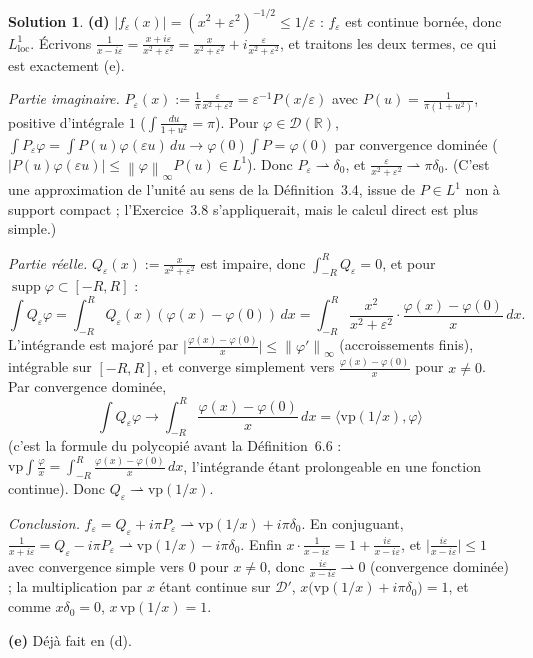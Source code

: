 \documentclass[11pt,a4paper]{article}
\newcommand{\R}{\mathbb{R}}
\newcommand{\norm}[1]{\left\|#1\right\|}
\newcommand{\wk}{\rightharpoonup}
\DeclareMathOperator{\supp}{supp}
\newcommand{\D}{\mathcal{D}}
\theoremstyle{definition}
\newtheorem*{solution}{Solution}
\begin{document}
\begin{solution}
\medskip
\noindent\textbf{(d)} $|f_\varepsilon(x)|=(x^2+\varepsilon^2)^{-1/2}\le1/\varepsilon$ : $f_\varepsilon$ est continue bornée, donc $L^1_{\mathrm{loc}}$. Écrivons $\frac1{x-i\varepsilon}=\frac{x+i\varepsilon}{x^2+\varepsilon^2}=\frac x{x^2+\varepsilon^2}+i\frac\varepsilon{x^2+\varepsilon^2}$, et traitons les deux termes, ce qui est exactement (e).

\emph{Partie imaginaire.} $P_\varepsilon(x):=\frac1\pi\frac\varepsilon{x^2+\varepsilon^2}=\varepsilon^{-1}P(x/\varepsilon)$ avec $P(u)=\frac1{\pi(1+u^2)}$, positive d'intégrale $1$ ($\int\frac{du}{1+u^2}=\pi$). Pour $\varphi\in\D(\R)$, $\int P_\varepsilon\varphi=\int P(u)\varphi(\varepsilon u)\,du\to\varphi(0)\int P=\varphi(0)$ par convergence dominée ($|P(u)\varphi(\varepsilon u)|\le\norm\varphi_\infty P(u)\in L^1$). Donc $P_\varepsilon\wk\delta_0$, et $\frac\varepsilon{x^2+\varepsilon^2}\wk\pi\delta_0$. (C'est une approximation de l'unité au sens de la Définition~3.4, issue de $P\in L^1$ non à support compact ; l'Exercice~3.8 s'appliquerait, mais le calcul direct est plus simple.)

\emph{Partie réelle.} $Q_\varepsilon(x):=\frac x{x^2+\varepsilon^2}$ est impaire, donc $\int_{-R}^RQ_\varepsilon=0$, et pour $\supp\varphi\subset[-R,R]$ :
\[
\int Q_\varepsilon\varphi=\int_{-R}^RQ_\varepsilon(x)(\varphi(x)-\varphi(0))\,dx=\int_{-R}^R\frac{x^2}{x^2+\varepsilon^2}\cdot\frac{\varphi(x)-\varphi(0)}x\,dx .
\]
L'intégrande est majoré par $\big|\frac{\varphi(x)-\varphi(0)}x\big|\le\norm{\varphi'}_\infty$ (accroissements finis), intégrable sur $[-R,R]$, et converge simplement vers $\frac{\varphi(x)-\varphi(0)}x$ pour $x\ne0$. Par convergence dominée,
\[
\int Q_\varepsilon\varphi\longrightarrow\int_{-R}^R\frac{\varphi(x)-\varphi(0)}x\,dx=\langle\mathrm{vp}(1/x),\varphi\rangle
\]
(c'est la formule du polycopié avant la Définition~6.6 : $\mathrm{vp}\int\frac\varphi x=\int_{-R}^R\frac{\varphi(x)-\varphi(0)}x\,dx$, l'intégrande étant prolongeable en une fonction continue). Donc $Q_\varepsilon\wk\mathrm{vp}(1/x)$.

\emph{Conclusion.} $f_\varepsilon=Q_\varepsilon+i\pi P_\varepsilon\wk\mathrm{vp}(1/x)+i\pi\delta_0$. En conjuguant, $\frac1{x+i\varepsilon}=Q_\varepsilon-i\pi P_\varepsilon\wk\mathrm{vp}(1/x)-i\pi\delta_0$. Enfin $x\cdot\frac1{x-i\varepsilon}=1+\frac{i\varepsilon}{x-i\varepsilon}$, et $\big|\frac{i\varepsilon}{x-i\varepsilon}\big|\le1$ avec convergence simple vers $0$ pour $x\ne0$, donc $\frac{i\varepsilon}{x-i\varepsilon}\wk0$ (convergence dominée) ; la multiplication par $x$ étant continue sur $\D'$, $x\big(\mathrm{vp}(1/x)+i\pi\delta_0\big)=1$, et comme $x\delta_0=0$, $x\,\mathrm{vp}(1/x)=1$.

\medskip
\noindent\textbf{(e)} Déjà fait en (d).
\end{solution}
\end{document}
